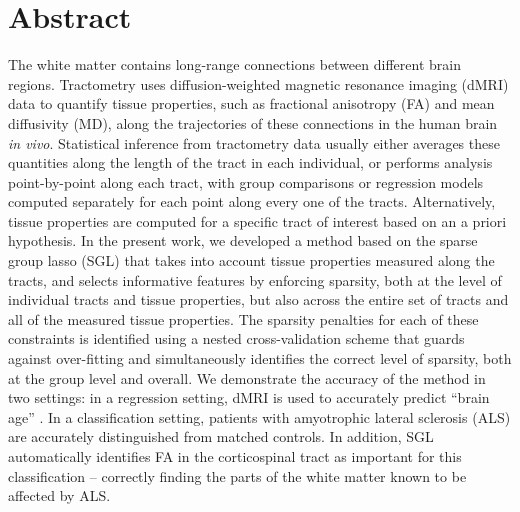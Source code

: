 \section*{Abstract}

The white matter contains long-range connections between different brain
regions. Tractometry uses diffusion-weighted magnetic resonance imaging (dMRI)
data to quantify tissue properties, such as fractional anisotropy (FA) and mean
diffusivity (MD), along the trajectories of these connections in the human brain
\emph{in vivo}\cite{yeatman2012tract}. Statistical inference from tractometry
data usually either averages these quantities along the length of the tract in
each individual, or performs analysis point-by-point along each tract, with
group comparisons or regression models computed separately for each point along
every one of the tracts. Alternatively, tissue properties are computed for a
specific tract of interest based on an a priori hypothesis. In the present work,
we developed a method based on the sparse group lasso (SGL)
\cite{simon2013sparse} that takes into account tissue properties measured along
the tracts, and selects informative features by enforcing sparsity, both at the
level of individual tracts and tissue properties, but also across the entire set
of tracts and all of the measured tissue properties. The sparsity penalties for
each of these constraints is identified using a nested cross-validation scheme
that guards against over-fitting and simultaneously identifies the correct level
of sparsity, both at the group level and overall. We demonstrate the accuracy of
the method in two settings: in a regression setting, dMRI is used to accurately
predict ``brain age'' \cite{yeatman2014lifespan, Brown2012-so}. In a
classification setting, patients with amyotrophic lateral sclerosis (ALS) are
accurately distinguished from matched controls\cite{sarica2017corticospinal}. In
addition, SGL automatically identifies FA in the corticospinal tract as
important for this classification -- correctly finding the parts of the white
matter known to be affected by ALS. 
